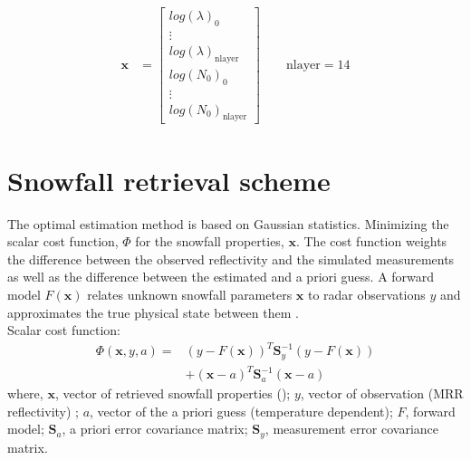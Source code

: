 \begin{align}
	\mathbf{x} & = \begin{bmatrix}
		log(\lambda)_0 	\\
        \vdots 			\\
        log(\lambda)_{\text{nlayer}} 	\\
        log(N_0)_0		\\
        \vdots			\\
        log(N_0)_{\text{nlayer}}		
	\end{bmatrix} \qquad \text{nlayer} = 14
	\label{eq:snow_prop}
\end{align}
    
\section{Snowfall retrieval scheme}\label{sec:ret_scheme}
The optimal estimation method is based on Gaussian statistics. Minimizing the scalar cost function, $\Phi$ for the snowfall properties, $\mathbf{x}$. The cost function weights the difference between the observed reflectivity and the simulated measurements as well as the difference between the estimated and a priori guess. A forward model $F(\mathbf{x})$ relates unknown snowfall parameters $\mathbf{x}$ to radar observations $y$ and approximates the true physical state between them \citep{wood_estimating_2014,cooper_variational_2017}. \\
Scalar cost function:
\begin{equation}
	\begin{split}
	\Phi(\mathbf{x},y,a) = &(y- F(\mathbf{x}))^T \mathbf{S}_y^{-1} 			(y-F(\mathbf{x})) \\
		&+(\mathbf{x}-a)^T \mathbf{S}_{a}^{-1} (\mathbf{x}-a)
	\end{split} \label{eq:scalar_cost_fct}
\end{equation}
where, $\mathbf{x}$, vector of retrieved snowfall properties (); $y$, vector of observation (MRR reflectivity) ; $a$, vector of the a priori guess (temperature dependent); $F$, forward model; $\mathbf{S}_a$, a priori error covariance matrix; $\mathbf{S}_y$, measurement error covariance matrix. \\

